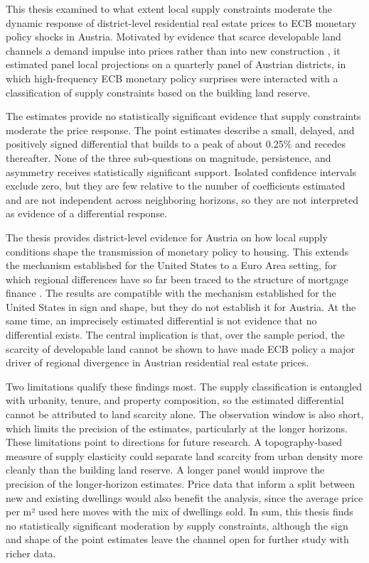 \documentclass[a4paper,12pt, headsepline]{scrartcl}
\numberwithin{equation}{section}
\begin{document}
This thesis examined to what extent local supply constraints moderate the dynamic response of district-level residential real estate prices to ECB monetary policy shocks in Austria. Motivated by evidence that scarce developable land channels a demand impulse into prices rather than into new construction \citep{saiz2010, aastveit2022}, it estimated panel local projections on a quarterly panel of Austrian districts, in which high-frequency ECB monetary policy surprises were interacted with a classification of supply constraints based on the building land reserve.

The estimates provide no statistically significant evidence that supply constraints moderate the price response. The point estimates describe a small, delayed, and positively signed differential that builds to a peak of about 0.25\% and recedes thereafter. None of the three sub-questions on magnitude, persistence, and asymmetry receives statistically significant support. Isolated confidence intervals exclude zero, but they are few relative to the number of coefficients estimated and are not independent across neighboring horizons, so they are not interpreted as evidence of a differential response.

The thesis provides district-level evidence for Austria on how local supply conditions shape the transmission of monetary policy to housing. This extends the mechanism established for the United States \citep{aastveit2022} to a Euro Area setting, for which regional differences have so far been traced to the structure of mortgage finance \citep{battistini2025}. The results are compatible with the mechanism established for the United States in sign and shape, but they do not establish it for Austria. At the same time, an imprecisely estimated differential is not evidence that no differential exists. The central implication is that, over the sample period, the scarcity of developable land cannot be shown to have made ECB policy a major driver of regional divergence in Austrian residential real estate prices.

Two limitations qualify these findings most. The supply classification is entangled with urbanity, tenure, and property composition, so the estimated differential cannot be attributed to land scarcity alone. The observation window is also short, which limits the precision of the estimates, particularly at the longer horizons. These limitations point to directions for future research. A topography-based measure of supply elasticity could separate land scarcity from urban density more cleanly than the building land reserve. A longer panel would improve the precision of the longer-horizon estimates. Price data that inform a split between new and existing dwellings would also benefit the analysis, since the average price per m² used here moves with the mix of dwellings sold. In sum, this thesis finds no statistically significant moderation by supply constraints, although the sign and shape of the point estimates leave the channel open for further study with richer data.
\end{document}
